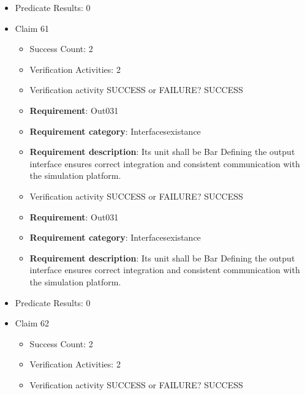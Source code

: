 \documentclass{article}
\begin{document}
\begin{itemize}
\begin{itemize}
					\item Verification activity SUCCESS or FAILURE? SUCCESS
		
						\item \textbf{Requirement}: Out030 
						\item \textbf{Requirement category}: Interfacesexistance 
						\item \textbf{Requirement description}: Its unit shall be Bar Defining the output interface ensures correct integration and consistent communication with the simulation platform.
					
				\end{itemize}
				
									    
				\item Predicate Results: 0

  				  \item Claim 61
				\begin{itemize}
			    	\item Success Count: 2 
			    	\item Verification Activities: 2
					\item Verification activity SUCCESS or FAILURE? SUCCESS
		
						\item \textbf{Requirement}: Out031 
						\item \textbf{Requirement category}: Interfacesexistance 
						\item \textbf{Requirement description}: Its unit shall be Bar Defining the output interface ensures correct integration and consistent communication with the simulation platform.
					
					\item Verification activity SUCCESS or FAILURE? SUCCESS
		
						\item \textbf{Requirement}: Out031 
						\item \textbf{Requirement category}: Interfacesexistance 
						\item \textbf{Requirement description}: Its unit shall be Bar Defining the output interface ensures correct integration and consistent communication with the simulation platform.
					
				\end{itemize}
				
									    
				\item Predicate Results: 0

  				  \item Claim 62
				\begin{itemize}
			    	\item Success Count: 2 
			    	\item Verification Activities: 2
					\item Verification activity SUCCESS or FAILURE? SUCCESS
		

\end{itemize}
\end{itemize}
\end{document}
